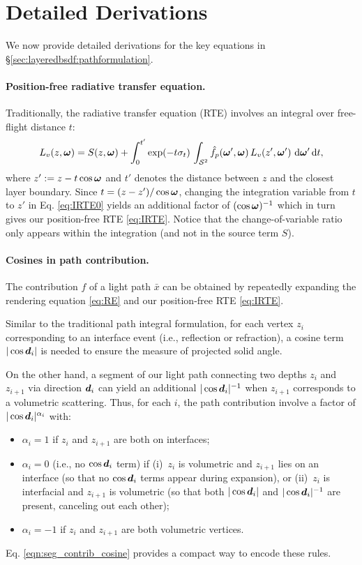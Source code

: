 \section{Detailed Derivations}
\label{sec:layeredbsdf:derivation}

We now provide detailed derivations for the key equations in \S\ref{sec:layeredbsdf:pathformulation}.

\paragraph{Position-free radiative transfer equation.}
Traditionally, the radiative transfer equation (RTE) involves an integral over free-flight distance $t$:
\begin{equation}
\label{eq:IRTE0}
  L_v(z, \bm\omega) = S(z, \bm\omega) + \int_0^{t'} \exp(-t \sigma_t) \, \int_{\mathcal{S}^2} \hat f_p(\bm\omega', \bm\omega) \, L_v(z', \bm\omega') \,\,\mathrm{d} \bm\omega' \,\mathrm{d} t,
\end{equation}
where $z' := z - t\cos\bm\omega$ and $t'$ denotes the distance between $z$ and the closest layer boundary.
Since $t = (z - z')/\cos\bm\omega$, changing the integration variable from $t$ to $z'$ in Eq. \eqref{eq:IRTE0} yields an additional factor of $(\cos\bm\omega)^{-1}$ which in turn gives our position-free RTE \eqref{eq:IRTE}.
Notice that the change-of-variable ratio only appears within the integration (and not in the source term $S$).

\paragraph{Cosines in path contribution.}
The contribution $f$ of a light path $\bar{x}$ can be obtained by repeatedly expanding the rendering equation \eqref{eq:RE} and our position-free RTE \eqref{eq:IRTE}.

Similar to the traditional path integral formulation, for each vertex $z_i$ corresponding to an interface event (i.e., reflection or refraction), a cosine term $|\cos\bm{d}_i|$ is needed to ensure the measure of projected solid angle.

On the other hand, a segment of our light path connecting two depths $z_i$ and $z_{i + 1}$ via direction $\bm{d}_i$ can yield an additional $|\cos\bm{d}_i|^{-1}$ when $z_{i + 1}$ corresponds to a volumetric scattering.
Thus, for each $i$, the path contribution involve a factor of $|\cos\bm{d}_i|^{\alpha_i}$ with:
\begin{itemize}
	\item $\alpha_i = 1$ if $z_i$ and $z_{i + 1}$ are both on interfaces;
	\item $\alpha_i = 0$ (i.e., no $\cos\bm{d}_i$ term) if (i)~$z_i$ is volumetric and $z_{i + 1}$ lies on an interface (so that no $\cos\bm{d}_i$ terms appear during expansion), or (ii)~$z_i$ is interfacial and $z_{i + 1}$ is volumetric (so that both $|\cos\bm{d}_i|$ and $|\cos\bm{d}_i|^{-1}$ are present, canceling out each other);
	\item $\alpha_i = -1$ if $z_i$ and $z_{i + 1}$ are both volumetric vertices.
\end{itemize}
Eq. \eqref{eqn:seg_contrib_cosine} provides a compact way to encode these rules. 
